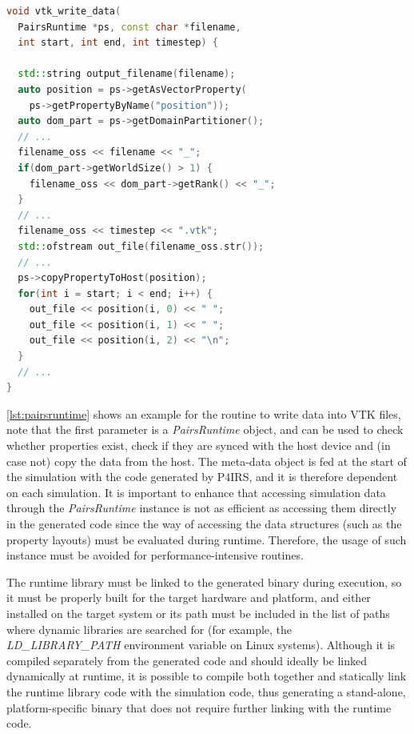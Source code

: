 \documentclass[Afour,sageh,times]{sagej}
\newcommand{\RMchange}[1]{{\color{blue} #1}}
\begin{document}
\begin{lstlisting}[language=C++,
		   label={lst:pairsruntime},
	   	   caption={P4IRS runtime routine example for writing VTK data into a file.}]
void vtk_write_data(
  PairsRuntime *ps, const char *filename,
  int start, int end, int timestep) {

  std::string output_filename(filename);
  auto position = ps->getAsVectorProperty(
    ps->getPropertyByName("position"));
  auto dom_part = ps->getDomainPartitioner();
  // ...
  filename_oss << filename << "_";
  if(dom_part->getWorldSize() > 1) {
    filename_oss << dom_part->getRank() << "_";
  }
  // ...
  filename_oss << timestep << ".vtk";
  std::ofstream out_file(filename_oss.str());
  // ...
  ps->copyPropertyToHost(position);
  for(int i = start; i < end; i++) {
    out_file << position(i, 0) << " ";
    out_file << position(i, 1) << " ";
    out_file << position(i, 2) << "\n";
  }
  // ...
}
\end{lstlisting}

\autoref{lst:pairsruntime} shows an example for the routine to write data into VTK files, note that the first parameter is a \emph{PairsRuntime} object, and can be used to check whether properties exist, check if they are synced with the host device and (in case not) copy the data from the host.
The meta-data object is \RMchange{fed} at the start of the simulation with the code generated by P4IRS, and it is therefore dependent on each simulation.
It is important to enhance that accessing simulation data through the \emph{PairsRuntime} instance is not as efficient as accessing them directly in the generated code since the way of accessing the data structures (such as the property layouts) must be evaluated during runtime.
Therefore, the usage of such instance must be avoided for performance-intensive routines.

\RMchange{The runtime library must be linked to the generated binary during execution, so it must be properly built for the target hardware and platform, and either installed on the target system or its path must be included in the list of paths where dynamic libraries are searched for (for example, the \emph{LD\_LIBRARY\_PATH} environment variable on Linux systems).
Although it is compiled separately from the generated code and should ideally be linked dynamically at runtime, it is possible to compile both together and statically link the runtime library code with the simulation code, thus generating a stand-alone, platform-specific binary that does not require further linking with the runtime code.}
\end{document}
